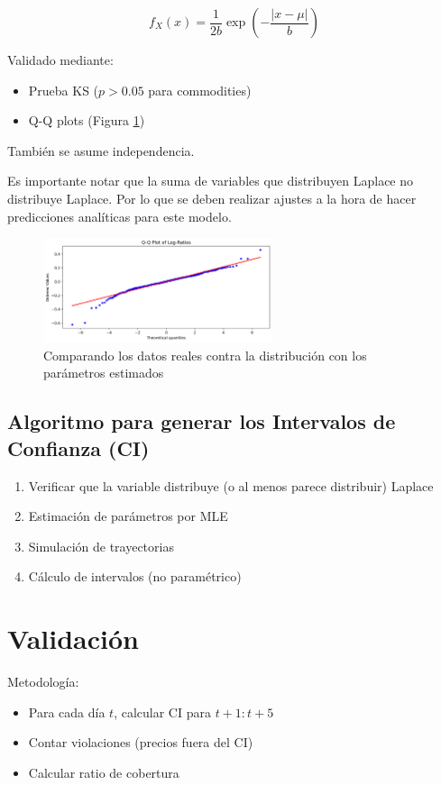 \documentclass{article}
\begin{document}
\begin{equation}
f_X(x) = \frac{1}{2b}\exp\left(-\frac{|x-\mu|}{b}\right)
\end{equation}

Validado mediante:
\begin{itemize}
\item Prueba KS ($p > 0.05$ para commodities)
\item Q-Q plots (Figura \ref{fig:qq})
\end{itemize}

También se asume independencia.

Es importante notar que la suma de variables que distribuyen Laplace no distribuye Laplace. Por lo que se deben realizar ajustes a la hora de hacer predicciones analíticas para este modelo.

\begin{figure}[h]
\centering
\includegraphics[width=0.6\textwidth]{qq_plot}
\caption{Comparando los datos reales contra la distribución con los parámetros estimados}
\label{fig:qq}
\end{figure}

\subsection{Algoritmo para generar los Intervalos de Confianza (CI)}
\begin{enumerate}
\item Verificar que la variable distribuye (o al menos parece distribuir) Laplace
\item Estimación de parámetros por MLE
\item Simulación de trayectorias
\item Cálculo de intervalos (no paramétrico)
\end{enumerate}

\section{Validación}
Metodología:
\begin{itemize}
\item Para cada día $t$, calcular CI para $t+1:t+5$
\item Contar violaciones (precios fuera del CI)
\item Calcular ratio de cobertura
\end{itemize}
\end{document}
